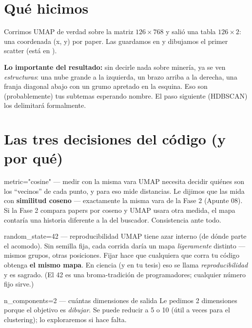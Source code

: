 \documentclass[11pt,a4paper]{article}
\begin{document}

\section{Qué hicimos}

Corrimos UMAP de verdad sobre la matriz $126 \times 768$ y salió una tabla $126 \times 2$:
una coordenada (x, y) por paper. Las guardamos en 
y dibujamos el primer scatter (está en ).

\textbf{Lo importante del resultado:} sin decirle nada sobre minería, ya se ven
\emph{estructuras}: una nube grande a la izquierda, un brazo arriba a la derecha, una franja
diagonal abajo con un grumo apretado en la esquina. Eso son (probablemente) tus subtemas
esperando nombre. El paso siguiente (HDBSCAN) los delimitará formalmente.

\section{Las tres decisiones del código (y por qué)}

\begin{concepto}{metric="cosine" — medir con la misma vara}
UMAP necesita decidir quiénes son los ``vecinos'' de cada punto, y para eso mide distancias.
Le dijimos que las mida con \textbf{similitud coseno} — exactamente la misma vara de la
Fase 2 (Apunte 08). Si la Fase 2 compara papers por coseno y UMAP usara otra medida, el mapa
contaría una historia diferente a la del buscador. Consistencia ante todo.
\end{concepto}

\begin{concepto}{random\_state=42 — reproducibilidad}
UMAP tiene azar interno (de dónde parte el acomodo). Sin semilla fija, cada corrida daría un
mapa \emph{ligeramente} distinto — mismos grupos, otras posiciones. Fijar
 hace que cualquiera que corra tu código obtenga \textbf{el mismo
mapa}. En ciencia (y en tu tesis) eso se llama \emph{reproducibilidad} y es sagrado.
(El 42 es una broma-tradición de programadores; cualquier número fijo sirve.)
\end{concepto}

\begin{concepto}{n\_components=2 — cuántas dimensiones de salida}
Le pedimos 2 dimensiones porque el objetivo es \emph{dibujar}. Se puede reducir a 5 o 10
(útil a veces para el clustering); lo exploraremos si hace falta.
\end{concepto}
\end{document}
